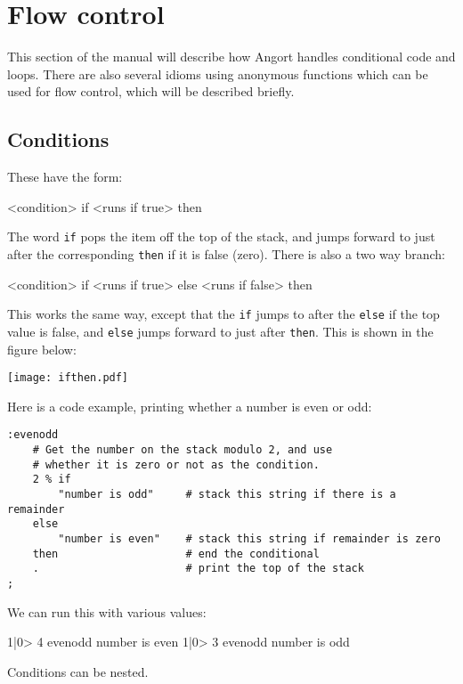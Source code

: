 
\section{Flow control}
This section of the manual will describe how Angort handles conditional
code and loops. There are also several idioms using anonymous functions
which can be used for flow control, which will be described briefly.

\subsection{Conditions}
\label{conditions}
These have the form:
\begin{v}
<condition> if <runs if true> then
\end{v}
The word \texttt{if} pops the item off the top of the stack,
and jumps forward to just after the corresponding \texttt{then} if it is false (zero).
There is also a two way branch:
\begin{v}
<condition> if <runs if true> else <runs if false> then
\end{v}
This works the same way, except that the \texttt{if} jumps to after the
\texttt{else} if the top value is false, and \texttt{else} jumps forward
to just after \texttt{then}. This is shown in the figure below:
\begin{center}
\texttt{[image: ifthen.pdf]}
\end{center}
Here is a code example, printing whether a number is even or odd:
\begin{lstlisting}
:evenodd 
    # Get the number on the stack modulo 2, and use
    # whether it is zero or not as the condition.
    2 % if
        "number is odd"     # stack this string if there is a remainder
    else
        "number is even"    # stack this string if remainder is zero
    then                    # end the conditional
    .                       # print the top of the stack
;
\end{lstlisting}
We can run this with various values:
\begin{v}
1|0> 4 evenodd
number is even
1|0> 3 evenodd
number is odd
\end{v}
Conditions can be nested.



